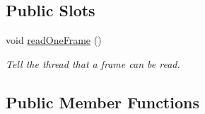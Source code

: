 \subsection*{Public Slots}
\begin{DoxyCompactItemize}
\item 
void \hyperlink{classmdt_usbtmc_port_a86ee5e17c32dea75e9f918389d3f7afc}{readOneFrame} ()
\begin{DoxyCompactList}\small\item\em Tell the thread that a frame can be read. \end{DoxyCompactList}\end{DoxyCompactItemize}
\subsection*{Public Member Functions}
